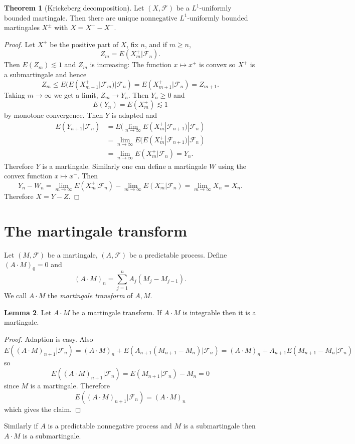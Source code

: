 \documentclass[12pt]{book}
\newcommand{\dfn}[1]{\emph{#1}\index{#1}}
\theoremstyle{definition}
\newtheorem{theorem}{Theorem}[chapter]
\newtheorem{lemma}[theorem]{Lemma}
\newenvironment{definition}
  {\pushQED{\qed}\renewcommand{\qedsymbol}{$\diamondsuit$}\definitionx}
  {\popQED\endexamplex}
\begin{document}
\begin{theorem}[Krickeberg decomposition]
Let $(X, \mathcal F)$ be a $L^1$-uniformly bounded martingale.
Then there are unique nonnegative $L^1$-uniformly bounded martingales $X^\pm$ with $X = X^+ - X^-$.
\end{theorem}
\begin{proof}
Let $X^+$ be the positive part of $X$, fix $n$, and if $m \geq n$,
$$Z_m = E(X_m^+|\mathcal F_n).$$
Then $E(Z_m) \lesssim 1$ and $Z_m$ is increasing:
The function $x \mapsto x^+$ is convex so $X^+$ is a submartingale and hence
$$Z_m \leq E(E(X_{m+1}^+|\mathcal F_m)|\mathcal F_n) = E(X_{m+1}^+|\mathcal F_n) = Z_{m+1}.$$
Taking $m \to \infty$ we get a limit, $Z_m \to Y_n$.
Then $Y_n \geq 0$ and
$$E(Y_n) = E(X_m^+) \lesssim 1$$
by monotone convergence. Then $Y$ is adapted and
\begin{align*}
E(Y_{n+1}|\mathcal F_n) &= E(\lim_{n \to \infty} E(X_m^+|\mathcal F_{n+1})|\mathcal F_n)\\
& = \lim_{n \to \infty} E(E(X_m^+|\mathcal F_{n+1})|\mathcal F_n)\\
&= \lim_{n \to \infty} E(X_m^+|\mathcal F_n) = Y_n.
\end{align*}
Therefore $Y$ is a martingale.
Similarly one can define a martingale $W$ using the convex function $x \mapsto x^-$.
Then
$$Y_n - W_n = \lim_{m \to \infty} E(X_m^+|\mathcal F_n) - \lim_{m \to \infty} E(X_m^-|\mathcal F_n) = \lim_{m \to \infty} X_n = X_n.$$
Therefore $X = Y - Z$.
\end{proof}

\section{The martingale transform}
\begin{definition}
Let $(M, \mathcal F)$ be a martingale, $(A, \mathcal F)$ be a predictable process.
Define $(A \cdot M)_0 = 0$ and
$$(A \cdot M)_n = \sum_{j=1}^n A_j(M_j - M_{j-1}).$$
We call $A \cdot M$ the \dfn{martingale transform} of $A,M$.
\end{definition}

\begin{lemma}
Let $A \cdot M$ be a martingale transform.
If $A \cdot M$ is integrable then it is a martingale.
\end{lemma}
\begin{proof}
Adaption is easy. Also
$$E((A \cdot M)_{n+1}|\mathcal F_n) = (A \cdot M)_n + E(A_{n+1}(M_{n+1}-M_n)|\mathcal F_n) = (A\cdot M)_n + A_{n+1}E(M_{n+1} - M_n|\mathcal F_n)$$
so
$$E((A \cdot M)_{n+1}|\mathcal F_n) = E(M_{n+1}|\mathcal F_n) - M_n = 0$$
since $M$ is a martingale. Therefore
$$E((A \cdot M)_{n+1}|\mathcal F_n) = (A\cdot M)_n$$
which gives the claim.
\end{proof}
Similarly if $A$ is a predictable nonnegative process and $M$ is a submartingale then $A \cdot M$ is a submartingale.
\end{document}
